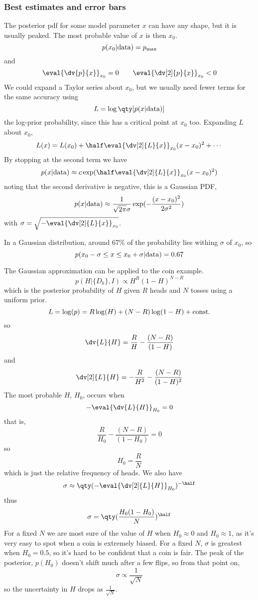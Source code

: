 \documentclass{dwnotes}         		        %
\begin{document}
\subsubsection{Best estimates and error bars}
\label{sec:bestestimate}

The posterior pdf for some model parameter $x$ can have any shape, but
it is usually peaked. The most probable value of $x$ is then $x_0$.
\[ p(x_0 | {\rm data}) = p_{\rm max} \]
and
\[ \eval{\dv{p}{x}}_{x_0} = 0 \qquad \eval{\dv[2]{p}{x}}_{x_0} <0 \]
We could expand a Taylor series about $x_0$, but we usually need fewer terms for the same accuracy using
\[ L = \log \qty[ p(x|{\rm data})] \]
the log-prior probability, since this has a critical point at $x_0$ too.
Expanding $L$ about $x_0$, 
\[ L(x) = L(x_0) + \half \eval{ \dv[2]{L}{x} }_{x_0} (x - x_0)^2 + \cdots \]
By stopping at the second term we have
\[ p(x|{\rm data}) \approx c \exp( \half \eval{\dv[2]{L}{x}}_{x_0} (x-x_0)^2 ) \]
noting that the second derivative is negative, this is a Gaussian PDF,
\[ p(x|{\rm data}) \approx \frac{1}{\sqrt{2 \pi} \sigma} \exp( -
\frac{(x-x_0)^2}{2 \sigma^2} ) \] with $\sigma = \sqrt{- \eval{
    \dv[2]{L}{x} }_{x_0} }$.

In a Gaussian distribution, around $67\%$ of the probability lies
withing $\sigma$ of $x_0$, so
\[ p(x_0 - \sigma \le x \le x_0 + \sigma | {\rm data}) = 0.67 \]

\begin{example}
  The Gaussian approximation can be applied to the coin example.
  \[ p(H|\{D_k\},I) \propto H^R (1-H)^{N-R} \] which is the posterior
  probability of $H$ given $R$ heads and $N$ tosses using a uniform
  prior.
  \[ L = \log(p) = R \log(H) + (N-R) \log(1-H) + {\rm const.} \]
so
\[ \dv{L}{H} = \frac{R}{H} - \frac{(N-R)}{(1-H)} \]
and
\[ \dv[2]{L}{H} = - \frac{R}{H^2} - \frac{(N-R)}{(1-H)^2} \] The most
probable $H$, $H_0$, occurs when \[ -\eval{ \dv{L}{H} }_{H_0} = 0 \]
that is,
\[ \frac{R}{H_0} - \frac{(N-R)}{(1-H_0)} = 0 \]
so
\[ H_0 = \frac{R}{N} \]
which is just the relative frequency of heads.
We also have
\[ \sigma \approx \qty( - \eval{ \dv[2]{L}{H} }_{H_0} )^{-\half} \]
thus
\[ \sigma = \qty( \frac{H_0(1-H_0)}{N} )^{\half} \] For a fixed $N$ we
are most sure of the value of $H$ when $H_0 \approx 0$ and $H_0
\approx 1$, as it's very easy to spot when a coin is extremely
biased. For a fixed $N$, $\sigma$ is greatest when $H_0=0.5$, so it's
hard to be confident that a coin is fair. The peak of the posterior,
$p(H_0)$ doesn't shift much after a few flips, so from that point on,
\[ \sigma \propto \frac{1}{\sqrt{N}} \] so the uncertainty in $H$
drops as $\frac{1}{\sqrt{N}}$.
\end{example}
\end{document}
